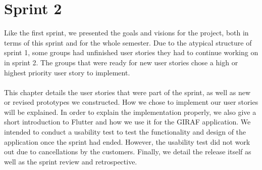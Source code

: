 \chapter{Sprint 2}
Like the first sprint, we presented the goals and visions for the project, both in terms of this sprint and for the whole semester.
Due to the atypical structure of sprint 1, some groups had unfinished user stories they had to continue working on in sprint 2.
The groups that were ready for new user stories chose a high or highest priority user story to implement.
\\\\
This chapter details the user stories that were part of the sprint, as well as new or revised prototypes we constructed.
How we chose to implement our user stories will be explained.
In order to explain the implementation properly, we also give a short introduction to Flutter and how we use it for the GIRAF application.
We intended to conduct a usability test to test the functionality and design of the application once the sprint had ended.
However, the usability test did not work out due to cancellations by the customers. 
Finally, we detail the release itself as well as the sprint review and retrospective.
